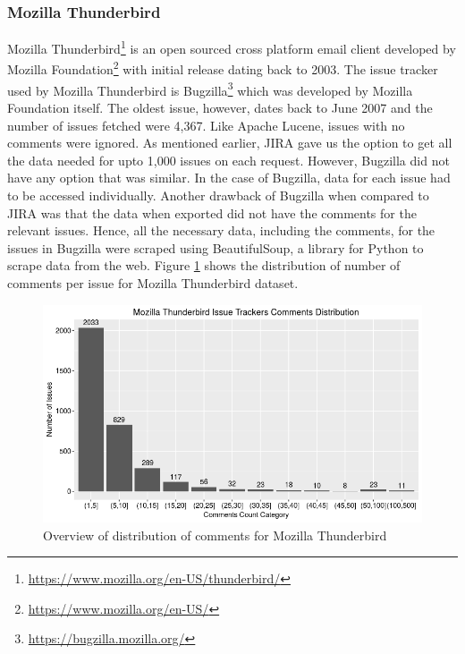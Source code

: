 \documentclass[a4paper,12pt,twoside]{report}
\begin{document}
\subsubsection{Mozilla Thunderbird}
Mozilla Thunderbird\footnote{\url{https://www.mozilla.org/en-US/thunderbird/}} is an open sourced cross platform email client developed by Mozilla Foundation\footnote{\url{https://www.mozilla.org/en-US/}} with initial release dating back to 2003. The issue tracker used by Mozilla Thunderbird is Bugzilla\footnote{\url{https://bugzilla.mozilla.org/}} which was developed by Mozilla Foundation itself. The oldest issue, however, dates back to June 2007 and the number of issues fetched were 4,367. Like Apache Lucene, issues with no comments were ignored. 
\newline
As mentioned earlier, JIRA gave us the option to get all the data needed for upto 1,000 issues on each request. However, Bugzilla did not have any option that was similar. In the case of Bugzilla, data for each issue had to be accessed individually. Another drawback of Bugzilla when compared to JIRA was that the data when exported did not have the comments for the relevant issues. Hence, all the necessary data, including the comments, for the issues in Bugzilla were scraped using BeautifulSoup, a library for Python to scrape data from the web. Figure \ref{fig:thunderbirdRawDistro} shows the distribution of number of comments per issue for Mozilla Thunderbird dataset. 

\begin{figure}[h] %
    \centering
    \includegraphics[width=12cm]{thunderbird-comment-distribution-raw}
    \caption{Overview of distribution of comments for Mozilla Thunderbird}
    \label{fig:thunderbirdRawDistro}
\end{figure}
\end{document}
